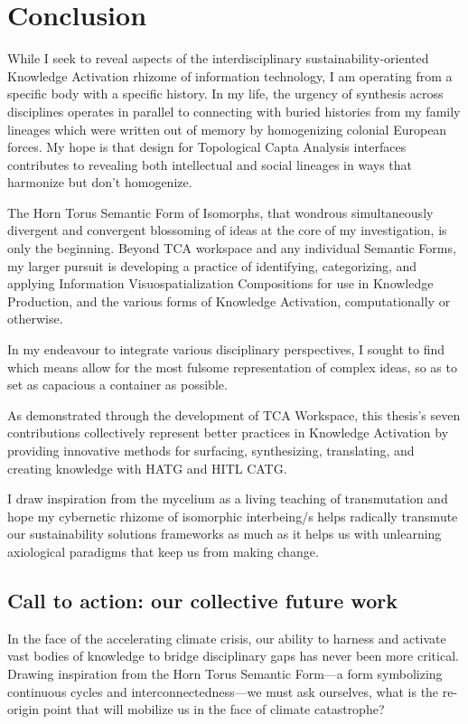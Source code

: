 \chapter{Conclusion}
While I seek to reveal aspects of the interdisciplinary sustainability-oriented Knowledge Activation rhizome of information technology, I am operating from a specific body with a specific history. In my life, the urgency of synthesis across disciplines operates in parallel to connecting with buried histories from my family lineages which were written out of memory by homogenizing colonial European forces. My hope is that design for Topological Capta Analysis interfaces contributes to revealing both intellectual and social lineages in ways that harmonize but don't homogenize.

The Horn Torus Semantic Form of Isomorphs, that wondrous simultaneously divergent and convergent blossoming of ideas at the core of my investigation, is only the beginning. Beyond TCA workspace and any individual Semantic Forms, my larger pursuit is developing a practice of identifying, categorizing, and applying Information Visuospatialization Compositions for use in Knowledge Production, and the various forms of Knowledge Activation, computationally or otherwise. 

In my endeavour to integrate various disciplinary perspectives, I sought to find which means allow for the most fulsome representation of complex ideas, so as to set as capacious a container as possible. 

As demonstrated through the development of TCA Workspace, this thesis's seven contributions collectively represent better practices in Knowledge Activation by providing innovative methods for surfacing, synthesizing, translating, and creating knowledge with HATG and HITL CATG.

I draw inspiration from the mycelium as a living teaching of transmutation and hope my cybernetic rhizome of isomorphic interbeing/s helps radically transmute our sustainability solutions frameworks as much as it helps us with unlearning axiological paradigms that keep us from making change. 

\section{Call to action: our collective future work}
In the face of the accelerating climate crisis, our ability to harness and activate vast bodies of knowledge to bridge disciplinary gaps has never been more critical. Drawing inspiration from the Horn Torus Semantic Form—a form symbolizing continuous cycles and interconnectedness—we must ask ourselves, what is the re-origin point that will mobilize us in the face of climate catastrophe? 


